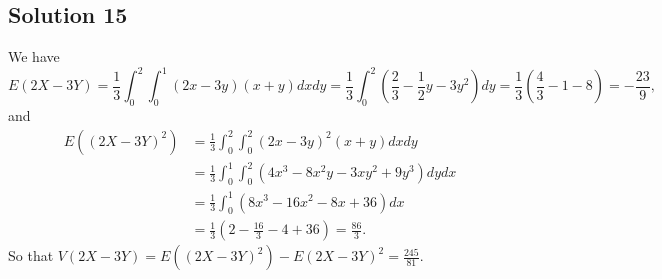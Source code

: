 \subsection*{Solution 15}

We have
\begin{equation*}
E(2X - 3Y) = \frac{1}{3} \int_0^2 \int_0^1 (2x - 3y)(x + y) dx dy
    = \frac{1}{3} \int_0^2 (\frac{2}{3} - \frac{1}{2}y - 3y^2) dy
    = \frac{1}{3} (\frac{4}{3} - 1 - 8)
    = - \frac{23}{9},
\end{equation*}
and
\begin{equation*}
\begin{split}
E((2X - 3Y)^2) &= \frac{1}{3} \int_0^2 \int_0^2 (2x - 3y)^2 (x + y) dx dy \\
    &= \frac{1}{3} \int_0^1 \int_0^2 (4x^3 - 8x^2y - 3xy^2 + 9y^3) dy dx \\
    &= \frac{1}{3} \int_0^1 (8x^3 - 16x^2 - 8x + 36) dx \\
    &= \frac{1}{3} (2 - \frac{16}{3} - 4 + 36)
    = \frac{86}{3}.
\end{split}
\end{equation*}
So that $V(2X - 3Y) = E((2X - 3Y)^2) - E(2X - 3Y)^2 = \frac{245}{81}$.
